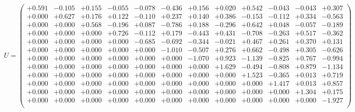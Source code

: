 \documentclass[9pt]{article}
\theoremstyle{plain}
\theoremstyle{definition}
\theoremstyle{remark}
\numberwithin{equation}{section}
\begin{document}
$U = \left(
\begin{array}{
cccccccccccc}
+0.591 & -0.105 & +0.155 & -0.055 & -0.078 & -0.436 & +0.156 & +0.020 & +0.542 & -0.043 & -0.043 & +0.307 \\
+0.000 & +0.627 & +0.176 & +0.122 & -0.110 & +0.237 & +0.140 & +0.386 & -0.153 & -0.112 & +0.334 & -0.563 \\
+0.000 & +0.000 & +0.568 & -0.196 & +0.087 & -0.786 & +0.188 & -0.296 & +0.642 & +0.048 & -0.057 & -0.189 \\
+0.000 & +0.000 & +0.000 & +0.726 & -0.112 & +0.179 & -0.443 & +0.431 & -0.708 & -0.263 & +0.517 & -0.362 \\
+0.000 & +0.000 & +0.000 & +0.000 & -0.685 & -0.692 & -0.344 & -0.021 & +0.467 & +0.261 & +0.370 & +0.131 \\
+0.000 & +0.000 & +0.000 & +0.000 & +0.000 & -1.010 & -0.507 & +0.276 & +0.662 & -0.498 & +0.305 & -0.626 \\
+0.000 & +0.000 & +0.000 & +0.000 & +0.000 & +0.000 & -1.070 & +0.923 & -1.139 & -0.825 & +0.767 & -0.994 \\
+0.000 & +0.000 & +0.000 & +0.000 & +0.000 & +0.000 & +0.000 & +1.629 & -0.494 & -0.808 & +0.879 & -1.134 \\
+0.000 & +0.000 & +0.000 & +0.000 & +0.000 & +0.000 & +0.000 & +0.000 & +1.523 & -0.365 & +0.013 & +0.719 \\
+0.000 & +0.000 & +0.000 & +0.000 & +0.000 & +0.000 & +0.000 & +0.000 & +0.000 & +1.417 & +0.013 & +0.857 \\
+0.000 & +0.000 & +0.000 & +0.000 & +0.000 & +0.000 & +0.000 & +0.000 & +0.000 & +0.000 & +1.304 & +0.175 \\
+0.000 & +0.000 & +0.000 & +0.000 & +0.000 & +0.000 & +0.000 & +0.000 & +0.000 & +0.000 & +0.000 & -1.927 \\
\end{array}
\right)$ \newline 
\end{document}
